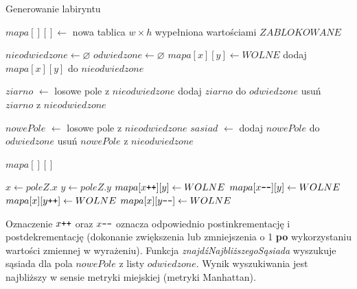 \begin{algorithm}[H]
	\caption{Generowanie labiryntu}\label{alg:mazegen}
  \begin{algorithmic}[1]

\State $mapa[][] \gets$ nowa tablica $w \times h$ wypełniona wartościami $ZABLOKOWANE$

\State $nieodwiedzone \gets \varnothing$ 
\State $odwiedzone \gets \varnothing$
 
	 
		\State $mapa[x][y] \gets WOLNE$
		\State dodaj $mapa[x][y]$ do $nieodwiedzone$
	\EndFor
\EndFor

\State $ziarno$ $\gets$ losowe pole z $nieodwiedzone$
\State dodaj $ziarno$ do $odwiedzone$
\State usuń $ziarno$ z $nieodwiedzone$

 
	\State $nowePole$ $\gets$ losowe pole z $nieodwiedzone$
	\State $sasiad$ $\gets$ 
	\State {}
	\State dodaj $nowePole$ do $odwiedzone$
	\State usuń $nowePole$ z $nieodwiedzone$
\EndWhile

 $mapa[][]$

\State 
{}
	\State $x \gets poleZ.x$
	\State $y \gets poleZ.y$
	 
		\State $mapa[x\verb-++-][y] \gets WOLNE$ 
	\EndWhile
	 
		\State $mapa[x\verb+--+][y] \gets WOLNE$
	\EndWhile
	 
		\State $mapa[x][y\verb-++-] \gets WOLNE$
	\EndWhile
	 
		\State $mapa[x][y\verb+--+] \gets WOLNE$
	\EndWhile
\EndFunction
  \end{algorithmic}
\end{algorithm}

Oznaczenie $x\verb-++-$ oraz $x\verb+--+$ oznacza odpowiednio postinkrementację i postdekrementację (dokonanie zwiększenia lub zmniejszenia o 1 {\bf po} wykorzystaniu wartości zmiennej w wyrażeniu).
Funkcja {\it znajdźNajbliższegoSąsiada} wyszukuje sąsiada dla pola $nowePole$ z listy $odwiedzone$. Wynik wyszukiwania jest najbliższy w sensie metryki miejskiej (metryki Manhattan).

